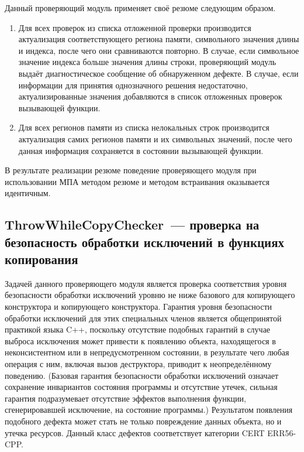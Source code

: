 Данный проверяющий модуль применяет своё резюме следующим образом.

\begin{enumerate}
 \item Для всех проверок из списка отложенной проверки производится актуализация соответствующего региона памяти, символьного значения длины и индекса, после чего они сравниваются повторно. В случае, если символьное значение индекса больше значения длины строки, проверяющий модуль выдаёт диагностическое сообщение об обнаруженном дефекте. В случае, если информации для принятия однозначного решения недостаточно, актуализированные значения добавляются в список отложенных проверок вызывающей функции.
 \item Для всех регионов памяти из списка нелокальных строк производится актуализация самих регионов памяти и их символьных значений, после чего данная информация сохраняется в состоянии вызывающей функции.
\end{enumerate}

В результате реализации резюме поведение проверяющего модуля при использовании МПА методом резюме и методом встраивания оказывается идентичным.

\subsection{ThrowWhileCopyChecker~--- проверка на безопасность обработки исключений в функциях копирования}

Задачей данного проверяющего модуля является проверка соответствия уровня безопасности обработки исключений уровню не ниже базового для копирующего конструктора и копирующего конструктора. Гарантия уровня безопасности обработки исключений для этих специальных членов является общепринятой практикой языка C++, поскольку отсутствие подобных гарантий в случае выброса исключения может привести к появлению объекта, находящегося в неконсистентном или в непредусмотренном состоянии, в результате чего любая операция с ним, включая вызов деструктора, приводит к неопределённому поведению. (Базовая гарантия безопасности обработки исключений означает сохранение инвариантов состояния программы и отсутствие утечек, сильная гарантия подразумевает отсутствие эффектов выполнения функции, сгенерировавшей исключение, на состояние программы.)  Результатом появления подобного дефекта может стать не только повреждение данных объекта, но и утечка ресурсов. Данный класс дефектов соответствует категории CERT ERR56-CPP.

